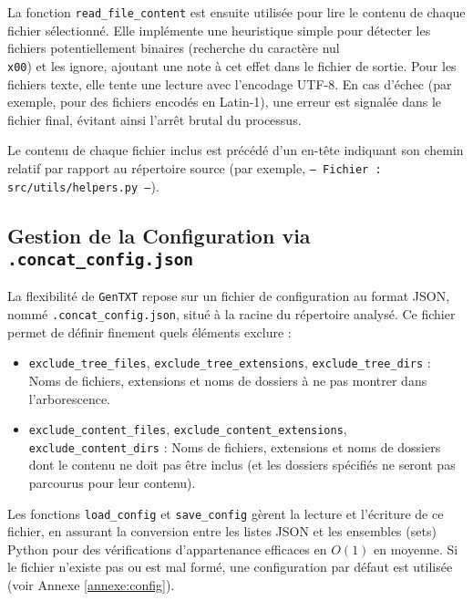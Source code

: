 \documentclass[11pt, a4paper]{article}
\begin{document}
La fonction \texttt{read\_file\_content} est ensuite utilisée pour lire le contenu de chaque fichier sélectionné. Elle implémente une heuristique simple pour détecter les fichiers potentiellement binaires (recherche du caractère nul \texttt{\\x00}) et les ignore, ajoutant une note à cet effet dans le fichier de sortie. Pour les fichiers texte, elle tente une lecture avec l'encodage UTF-8. En cas d'échec (par exemple, pour des fichiers encodés en Latin-1), une erreur est signalée dans le fichier final, évitant ainsi l'arrêt brutal du processus.

Le contenu de chaque fichier inclus est précédé d'un en-tête indiquant son chemin relatif par rapport au répertoire source (par exemple, \texttt{--- Fichier : src/utils/helpers.py ---}).

\subsection{Gestion de la Configuration via \texttt{.concat\_config.json}}
La flexibilité de \texttt{GenTXT} repose sur un fichier de configuration au format JSON, nommé \texttt{.concat\_config.json}, situé à la racine du répertoire analysé. Ce fichier permet de définir finement quels éléments exclure :
\begin{itemize}
    \item \texttt{exclude\_tree\_files}, \texttt{exclude\_tree\_extensions}, \texttt{exclude\_tree\_dirs} : Noms de fichiers, extensions et noms de dossiers à ne pas montrer dans l'arborescence.
    \item \texttt{exclude\_content\_files}, \texttt{exclude\_content\_extensions}, \texttt{exclude\_content\_dirs} : Noms de fichiers, extensions et noms de dossiers dont le contenu ne doit pas être inclus (et les dossiers spécifiés ne seront pas parcourus pour leur contenu).
\end{itemize}
Les fonctions \texttt{load\_config} et \texttt{save\_config} gèrent la lecture et l'écriture de ce fichier, en assurant la conversion entre les listes JSON et les ensembles (sets) Python pour des vérifications d'appartenance efficaces en $O(1)$ en moyenne. Si le fichier n'existe pas ou est mal formé, une configuration par défaut est utilisée (voir Annexe \ref{annexe:config}).
\end{document}

